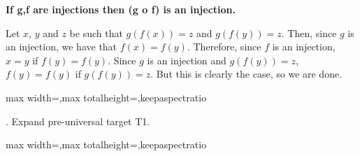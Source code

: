 \documentclass[a4paper,twoside,12pt]{article} %
\makeatletter
\DeclareRobustCommand{\_}{%
  \leavevmode\vbox{%
    \hrule\@width.4em
          \@height-.16ex
          \@depth\dimexpr.16ex+.28pt\relax}}
\newcommand\Tstrut{\rule{0pt}{2.4ex}}
\newcommand\Bstrut{\rule[-1.1ex]{0pt}{0pt}}
\newenvironment{fit}{\begin{adjustbox}{max width=\textwidth,max totalheight=\textheight,keepaspectratio}}{\end{adjustbox}}
\makeatother
\begin{document}
{\begin{center} \large \textbf{If g,f are injections then (g o f) is an injection.}\end{center}}\nopagebreak[4]

\begin{center}
\begin{minipage}{120mm}
Let $x$, $y$ and $z$ be such that $g(f(x)) = z$ and $g(f(y)) = z$. Then, since $g$ is an injection, we have that $f(x) = f(y)$. Therefore, since $f$ is an injection, $x = y$ if $f(y) = f(y)$. Since $g$ is an injection and $g(f(y)) = z$, $f(y) = f(y)$ if $g(f(y)) = z$. But this is clearly the case, so we are done.
\end{minipage}
\end{center}

\bigskip
\begin{steps}
\begin{fit}%
\end{fit}
\smallskip

. Expand pre-universal target T1.\nopagebreak[4] 
\marginpar{}\nopagebreak[4] 
\smallskip\nopagebreak[4] 

\begin{fit}%
\end{fit}
\smallskip


\end{steps}
\end{document}
